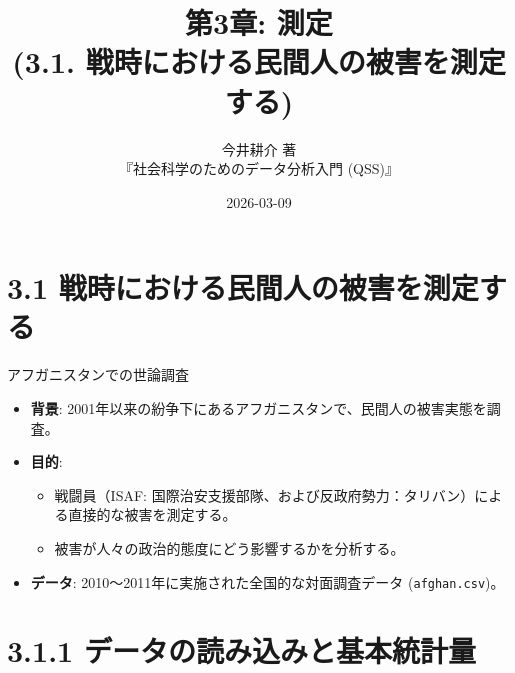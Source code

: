 \documentclass[
  ignorenonframetext,
]{beamer}
\title{第3章: 測定\\
(3.1. 戦時における民間人の被害を測定する)}
\subtitle{今井耕介 著\\
『社会科学のためのデータ分析入門 (QSS)』}
\author{}
\date{\vspace{-2.5em}2026-03-09}
\providecommand{\tightlist}{%
  \setlength{\itemsep}{0pt}\setlength{\parskip}{0pt}}
\begin{document}
\frame{\titlepage}

\hypertarget{ux6226ux6642ux306bux304aux3051ux308bux6c11ux9593ux4ebaux306eux88abux5bb3ux3092ux6e2cux5b9aux3059ux308b}{%
\section{3.1
戦時における民間人の被害を測定する}\label{ux6226ux6642ux306bux304aux3051ux308bux6c11ux9593ux4ebaux306eux88abux5bb3ux3092ux6e2cux5b9aux3059ux308b}}

\begin{frame}[fragile]{アフガニスタンでの世論調査}
\protect\hypertarget{ux30a2ux30d5ux30acux30cbux30b9ux30bfux30f3ux3067ux306eux4e16ux8ad6ux8abfux67fb}{}
\begin{itemize}
\tightlist
\item
  \textbf{背景}:
  2001年以来の紛争下にあるアフガニスタンで、民間人の被害実態を調査。
\item
  \textbf{目的}:

  \begin{itemize}
  \tightlist
  \item
    戦闘員（ISAF:
    国際治安支援部隊、および反政府勢力：タリバン）による直接的な被害を測定する。
  \item
    被害が人々の政治的態度にどう影響するかを分析する。
  \end{itemize}
\item
  \textbf{データ}: 2010〜2011年に実施された全国的な対面調査データ
  (\texttt{afghan.csv})。
\end{itemize}
\end{frame}

\hypertarget{ux30c7ux30fcux30bfux306eux8aadux307fux8fbcux307fux3068ux57faux672cux7d71ux8a08ux91cf}{%
\section{3.1.1
データの読み込みと基本統計量}\label{ux30c7ux30fcux30bfux306eux8aadux307fux8fbcux307fux3068ux57faux672cux7d71ux8a08ux91cf}}
\end{document}
